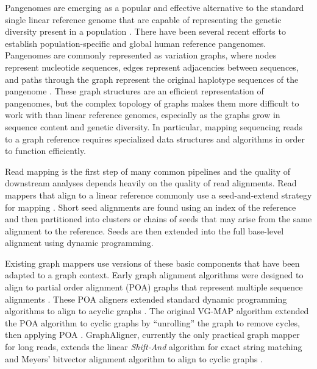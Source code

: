 \documentclass[11pt]{ucscthesis}
\begin{document}
Pangenomes are emerging as a popular and effective alternative to the standard single linear reference genome that are capable of representing the genetic diversity present in a population \cite{hprc_2022,miga_need_pangenome_2021}.
There have been several recent efforts to establish population-specific \citep{chinese_pangenome_2023,arab_pangenome_2024,pacific_pangenome_2024} and global \citep{hprc_pangenome_2023} human reference pangenomes.
Pangenomes are commonly represented as variation graphs, where nodes represent nucleotide sequences, edges represent adjacencies between sequences, and paths through the graph represent the original haplotype sequences of the pangenome \cite{garrison_vg_2018}. 
These graph structures are an efficient representation of pangenomes, but the complex topology of graphs makes them more difficult to work with than linear reference genomes, especially as the graphs grow in sequence content and genetic diversity.
In particular, mapping sequencing reads to a graph reference requires specialized data structures and algorithms in order to function efficiently.

Read mapping is the first step of many common pipelines and the quality of downstream analyses depends heavily on the quality of read alignments.
Read mappers that align to a linear reference commonly use a seed-and-extend strategy for mapping \cite{li_bwa_mem_2013,minimap2_2021,langmead_bowtie2_2012}.
Short seed alignments are found using an index of the reference and then partitioned into clusters or chains of seeds that may arise from the same alignment to the reference.
Seeds are then extended into the full base-level alignment using dynamic programming.

Existing graph mappers use versions of these basic components that have been adapted to a graph context.
Early graph alignment algorithms were designed to align to partial order alignment (POA) graphs that represent multiple sequence alignments \cite{lee_poa_2002}.
These POA aligners extended standard dynamic programming algorithms to align to acyclic graphs \cite{lee_poa_2002,grasso_poa_2004}.
The original VG-MAP algorithm extended the POA algorithm to cyclic graphs by ``unrolling'' the graph to remove cycles, then applying POA \cite{garrison_vg_2018}.
GraphAligner, currently the only practical graph mapper for long reads, extends the linear \textit{Shift-And} algorithm for exact string matching \citep{baeza-yates_shiftand_1992} and Meyers' bitvector alignment algorithm \citep{myers_bitvector_1999} to align to cyclic graphs \cite{rautiainen_bit-parallel_2019}.
\end{document}
